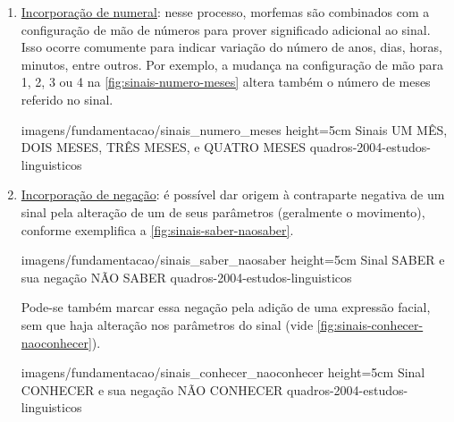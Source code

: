 \begin{enumerate}
\begin{enumerate}

        

        \item \underline{Incorporação de numeral}: nesse processo, morfemas são combinados com a configuração de mão de números para prover significado adicional ao sinal. Isso ocorre comumente para indicar variação do número de anos, dias, horas, minutos, entre outros. Por exemplo, a mudança na configuração de mão para 1, 2, 3 ou 4 na \autoref{fig:sinais-numero-meses} altera também o número de meses referido no sinal.
        
            {imagens/fundamentacao/sinais_numero_meses} %
            {height=5cm} %
            {Sinais UM MÊS, DOIS MESES, TRÊS MESES, e QUATRO MESES} %
            {quadros-2004-estudos-linguisticos} %



        \item \underline{Incorporação de negação}: é possível dar origem à contraparte negativa de um sinal pela alteração de um de seus parâmetros (geralmente o movimento), conforme exemplifica a \autoref{fig:sinais-saber-naosaber}.
        
            {imagens/fundamentacao/sinais_saber_naosaber} %
            {height=5cm} %
            {Sinal SABER e sua negação NÃO SABER} %
            {quadros-2004-estudos-linguisticos} %

        Pode-se também marcar essa negação pela adição de uma expressão facial, sem que haja alteração nos parâmetros do sinal (vide \autoref{fig:sinais-conhecer-naoconhecer}).

            {imagens/fundamentacao/sinais_conhecer_naoconhecer} %
            {height=5cm} %
            {Sinal CONHECER e sua negação NÃO CONHECER} %
            {quadros-2004-estudos-linguisticos} %


\end{enumerate}
\end{enumerate}
